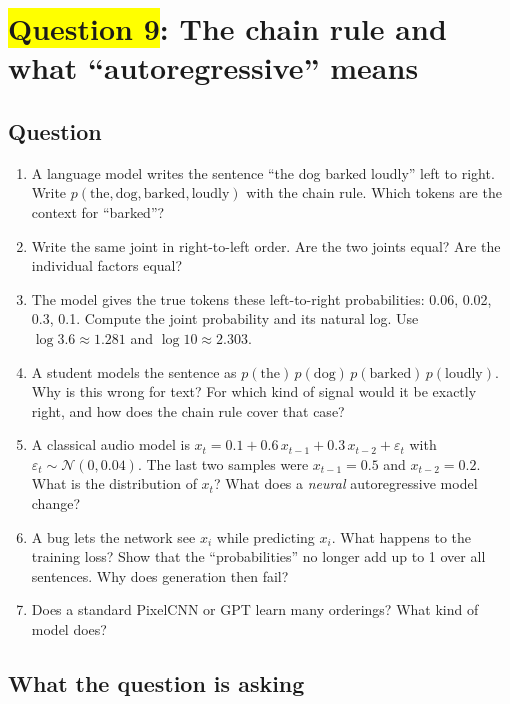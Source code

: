 \documentclass[12pt,a4paper]{article}
\begin{document}
\section{\texorpdfstring{\colorbox{yellow}{Question 9}}{Question 9}: The chain rule and what ``autoregressive'' means}

\subsection{Question}

\begin{enumerate}[label=(\alph*)]
  \item[\colorbox{yellow}{(a)}] A language model writes the sentence ``the dog barked loudly'' left to right. Write $p(\text{the},\text{dog},\text{barked},\text{loudly})$ with the chain rule. Which tokens are the context for ``barked''?
  \item[\colorbox{yellow}{(b)}] Write the same joint in right-to-left order. Are the two joints equal? Are the individual factors equal?
  \item The model gives the true tokens these left-to-right probabilities: 0.06, 0.02, 0.3, 0.1. Compute the joint probability and its natural log. Use $\log3.6\approx1.281$ and $\log10\approx2.303$.
  \item[\colorbox{yellow}{(d)}] A student models the sentence as $p(\text{the})\,p(\text{dog})\,p(\text{barked})\,p(\text{loudly})$. Why is this wrong for text? For which kind of signal would it be exactly right, and how does the chain rule cover that case?
  \item[\colorbox{yellow}{(e)}] A classical audio model is $x_t=0.1+0.6\,x_{t-1}+0.3\,x_{t-2}+\varepsilon_t$ with $\varepsilon_t\sim\mathcal{N}(0,0.04)$. The last two samples were $x_{t-1}=0.5$ and $x_{t-2}=0.2$. What is the distribution of $x_t$? What does a \emph{neural} autoregressive model change?
  \item A bug lets the network see $x_i$ while predicting $x_i$. What happens to the training loss? Show that the ``probabilities'' no longer add up to 1 over all sentences. Why does generation then fail?
  \item[\colorbox{yellow}{(g)}] Does a standard PixelCNN or GPT learn many orderings? What kind of model does?
\end{enumerate}

\subsection{What the question is asking}
\end{document}
